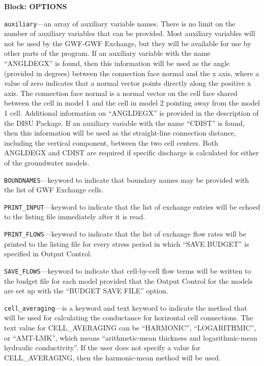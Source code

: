 
\item \textbf{Block: OPTIONS}

\begin{description}
\item \texttt{auxiliary}---an array of auxiliary variable names.  There is no limit on the number of auxiliary variables that can be provided. Most auxiliary variables will not be used by the GWF-GWF Exchange, but they will be available for use by other parts of the program.  If an auxiliary variable with the name ``ANGLDEGX'' is found, then this information will be used as the angle (provided in degrees) between the connection face normal and the x axis, where a value of zero indicates that a normal vector points directly along the positive x axis.  The connection face normal is a normal vector on the cell face shared between the cell in model 1 and the cell in model 2 pointing away from the model 1 cell.  Additional information on ``ANGLDEGX'' is provided in the description of the DISU Package.  If an auxiliary variable with the name ``CDIST'' is found, then this information will be used as the straight-line connection distance, including the vertical component, between the two cell centers.  Both ANGLDEGX and CDIST are required if specific discharge is calculated for either of the groundwater models.

\item \texttt{BOUNDNAMES}---keyword to indicate that boundary names may be provided with the list of GWF Exchange cells.

\item \texttt{PRINT\_INPUT}---keyword to indicate that the list of exchange entries will be echoed to the listing file immediately after it is read.

\item \texttt{PRINT\_FLOWS}---keyword to indicate that the list of exchange flow rates will be printed to the listing file for every stress period in which ``SAVE BUDGET'' is specified in Output Control.

\item \texttt{SAVE\_FLOWS}---keyword to indicate that cell-by-cell flow terms will be written to the budget file for each model provided that the Output Control for the models are set up with the ``BUDGET SAVE FILE'' option.

\item \texttt{cell\_averaging}---is a keyword and text keyword to indicate the method that will be used for calculating the conductance for horizontal cell connections.  The text value for CELL\_AVERAGING can be ``HARMONIC'', ``LOGARITHMIC'', or ``AMT-LMK'', which means ``arithmetic-mean thickness and logarithmic-mean hydraulic conductivity''. If the user does not specify a value for CELL\_AVERAGING, then the harmonic-mean method will be used.


\end{description}

